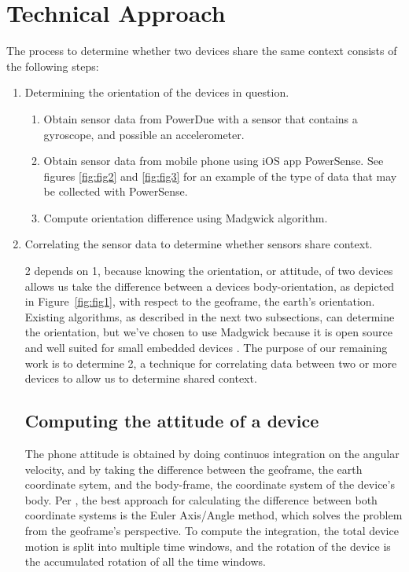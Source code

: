 \documentclass[journal]{IEEEtranTIE}
\begin{document}
\section{Technical Approach}

The process to determine whether two devices share the same context consists of
the following steps:

\begin{enumerate}
\item Determining the orientation of the devices in question.
\begin{enumerate}
\item Obtain sensor data from PowerDue with a sensor that contains a gyroscope,
      and possible an accelerometer.
\item Obtain sensor data from mobile phone using iOS app PowerSense. See figures
      \ref{fig:fig2} and \ref{fig:fig3} for an example of the type of data that
      may be collected with PowerSense.
\item Compute orientation difference using Madgwick algorithm.
\end{enumerate}
\item Correlating the sensor data to determine whether sensors share context.
\begin{enumerate}

2 depends on 1, because knowing the orientation, or attitude, of two devices
allows us take the difference between a devices body-orientation, as depicted in
Figure~\ref{fig:fig1}, with respect to the geoframe, the earth's orientation. Existing
algorithms, as described in the next two subsections, can determine the
orientation, but we've chosen to use Madgwick because it is open source and well
suited for small embedded devices \cite{Madgwick}. The purpose of our remaining
work is to determine 2, a technique for correlating data between two or more
devices to allow us to determine shared context.

\subsection{Computing the attitude of a device}

The phone attitude is obtained by doing continuos integration on the angular
velocity, and by taking the difference between the geoframe, the earth
coordinate sytem, and the body-frame, the coordinate system of the device's
body. Per \cite{PhoneAttitude}, the best approach for calculating the difference
between both coordinate systems is the Euler Axis/Angle method, which solves the
problem from the geoframe's perspective. To compute the integration, the total
device motion is split into multiple time windows, and the rotation of the
device is the accumulated rotation of all the time windows.


\end{enumerate}
\end{enumerate}
\end{document}

